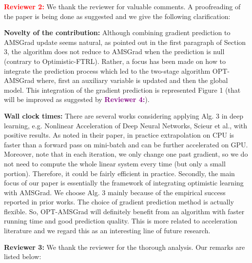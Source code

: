\documentclass{article}
\begin{document}
\textbf{\textcolor{red}{Reviewer 2:}} We thank the reviewer for valuable comments. A proofreading of the paper is being done as suggested and we give the following clarification:\vspace{-5pt}

\textbf{Novelty of the contribution:} Although combining gradient prediction to AMSGrad update seems natural, as pointed out in the first paragraph of Section 3, the algorithm does not reduce to AMSGrad when the prediction is null (contrary to Optimistic-FTRL). 
Rather, a focus has been made on how to integrate the prediction process which led to the two-stage algorithm OPT-AMSGrad where, first an auxiliary variable is updated and then the global model. 
This integration of the gradient prediction is represented Figure 1 (that will be improved as suggested by \textbf{\textcolor{purple}{Reviewer 4:}}).\vspace{-5pt}

\textbf{Wall clock times:}
There are several works considering applying Alg. 3 in deep learning, e.g. Nonlinear Acceleration of Deep Neural Networks, Scieur et al., with positive results. As noted in their paper, in practice extrapolation on CPU is faster than a forward pass on mini-batch and can be further accelerated on GPU. Moreover, note that in each iteration, we only change one past gradient, so we do not need to compute the whole linear system every time (but only a small portion).  Therefore, it could be fairly efficient in practice. Secondly, the main focus of our paper is essentially the framework of integrating optimistic learning with AMSGrad. We choose Alg. 3 mainly because of the empirical success reported in prior works. The choice of gradient prediction method is actually flexible. So, OPT-AMSGrad will definitely benefit from an algorithm with faster running time and good prediction quality. This is more related to acceleration literature and we regard this as an interesting line of future research.\vspace{-5pt}



\textbf{\textcolor{green!50!black}{Reviewer 3:}} We thank the reviewer for the thorough analysis. Our remarks are listed below:\vspace{-5pt}
\end{document}
